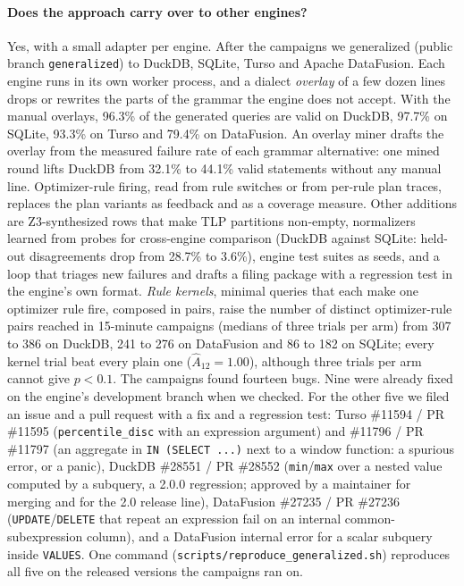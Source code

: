 \paragraph{Does the approach carry over to other engines?}
\label{sec:beyond}
Yes, with a small adapter per engine. After the \pg campaigns we generalized
\tool (public branch \texttt{generalized}) to DuckDB, SQLite, Turso and Apache
DataFusion. Each engine runs in its own worker process, and a dialect
\emph{overlay} of a few dozen lines drops or rewrites the parts of the \pg
grammar the engine does not accept. With the manual overlays, 96.3\% of the
generated queries are valid on DuckDB, 97.7\% on SQLite, 93.3\% on Turso and
79.4\% on DataFusion. An overlay miner drafts the overlay from the measured
failure rate of each grammar alternative: one mined round lifts DuckDB from 32.1\%
to 44.1\% valid statements without any manual line. Optimizer-rule firing, read
from rule switches or from per-rule plan traces, replaces the \pg plan variants
as feedback and as a coverage measure. Other additions are Z3-synthesized rows that
make TLP partitions non-empty, normalizers learned from probes for cross-engine
comparison (DuckDB against SQLite: held-out disagreements drop from 28.7\% to
3.6\%), engine test suites as seeds, and a loop that triages new failures and
drafts a filing package with a regression test in the engine's own format.
\emph{Rule kernels}, minimal queries that each make one optimizer rule fire,
composed in pairs, raise the number of distinct optimizer-rule pairs reached in
15-minute campaigns (medians of three trials per arm) from 307 to 386 on DuckDB,
241 to 276 on DataFusion and 86 to 182 on SQLite; every kernel trial beat every
plain one ($\hat{A}_{12}=1.00$), although three trials per arm cannot give $p<0.1$.
The campaigns found fourteen bugs. Nine were already fixed on the engine's
development branch when we checked. For the other five we filed an issue and a
pull request with a fix and a regression test:
Turso \#11594 / PR \#11595 (\texttt{percentile\_disc} with an expression argument)
and \#11796 / PR \#11797 (an aggregate in \texttt{IN (SELECT ...)} next to a
window function: a spurious error, or a panic),
DuckDB \#28551 / PR \#28552 (\texttt{min}/\texttt{max} over a nested value
computed by a subquery, a 2.0.0 regression; approved by a maintainer for merging
and for the 2.0 release line), DataFusion \#27235 / PR \#27236
(\texttt{UPDATE}/\texttt{DELETE} that repeat an expression fail on an internal
common-subexpression column), and a DataFusion internal error for a scalar
subquery inside \texttt{VALUES}. One command
(\texttt{scripts/reproduce\_generalized.sh}) reproduces all five on the released
versions the campaigns ran on.
